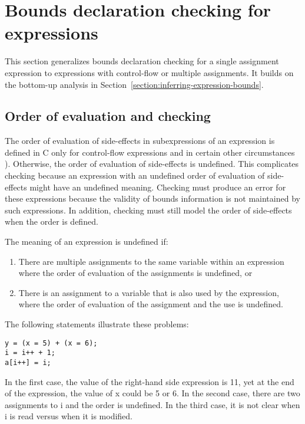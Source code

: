 \section{Bounds declaration checking for expressions}

\label{section:checking-complex-expressions}

This section generalizes bounds declaration checking for a single
assignment expression to expressions with control-flow or multiple
assignments.
It builds on the bottom-up analysis in
Section~\ref{section:inferring-expression-bounds}.

\subsection{Order of evaluation and checking}
\label{section:avoiding-undefinedness}

The order of evaluation of side-effects in subexpressions of an expression is defined in C only for 
control-flow expressions and in certain other circumstances \cite[Section 6.5,Annex C]{ISO2011}).
Otherwise, the order of evaluation of side-effects is undefined.   This complicates checking 
because an expression with an undefined order of evaluation of side-effects might have an 
undefined meaning.  Checking must produce an error for these expressions because the
validity of bounds information is not maintained by such expressions. In addition, checking must still
model the order of side-effects when the order is defined.

The meaning of an expression is undefined if:

\begin{enumerate}
\item
  There are multiple assignments to the same variable within an
  expression where the order of evaluation of the assignments is
  undefined, or
\item
  There is an assignment to a variable that is also used by the
  expression, where the order of evaluation of the assignment and the
  use is undefined.
\end{enumerate}

The following statements illustrate these problems:

\begin{lstlisting}
y = (x = 5) + (x = 6);
i = i++ + 1;
a[i++] = i;
\end{lstlisting}

In the first case, the value of the right-hand side expression is 11,
yet at the end of the expression, the value of x could be 5 or 6. In the
second case, there are two assignments to i and the order is undefined.
In the third case, it is not clear when i is read versus when it is
modified.

